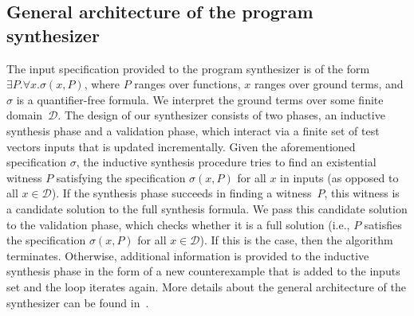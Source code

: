 \documentclass[runningheads,a4paper]{llncs}
\begin{document}

 
\subsection{General architecture of the program synthesizer}
\label{synthesizer-general}
The input specification provided to the program synthesizer is of the form
$\exists P .  \forall x.  \sigma(x, P)$, 
where $P$ ranges over functions, 
$x$ ranges over ground terms, 
and $\sigma$ is a quantifier-free formula.  
We interpret the ground terms over some finite domain~$\mathcal{D}$.
%
The design of our synthesizer consists of two phases, an inductive
synthesis phase and a validation phase, which interact via a finite
set of test vectors {\sc inputs} that is updated incrementally.  Given
the aforementioned specification $\sigma$, the inductive synthesis
procedure tries to find an existential witness $P$ satisfying
the specification $\sigma(x, P)$ for all $x$ in {\sc
  inputs} (as opposed to all $x \in \mathcal{D}$).
%
If the synthesis phase succeeds in finding a witness~$P$, this
witness is a candidate solution to the full synthesis formula.  We
pass this candidate solution to the validation phase, which checks
whether it is a full solution (i.e., $P$ satisfies the
specification $\sigma(x, P)$ for all
$x\in\mathcal{D}$).  If this is the case, then the algorithm
terminates.  Otherwise, additional information is provided to the
inductive synthesis phase in the form of a new counterexample that is
added to the {\sc inputs} set and the loop iterates again.
More details about the general architecture of the synthesizer can
be found in~\cite{DBLP:conf/lpar/DavidKL15}.
\end{document}

